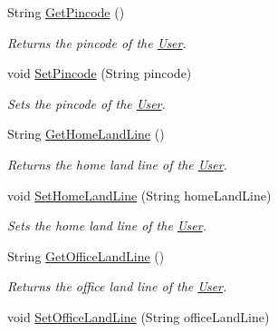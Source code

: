 \begin{DoxyCompactItemize}
String \hyperlink{classcom_1_1shephertz_1_1app42_1_1paas_1_1sdk_1_1csharp_1_1user_1_1_user_1_1_profile_a909844959aafaa5f1ec756ae49afcf9e}{Get\+Pincode} ()
\begin{DoxyCompactList}\small\item\em Returns the pincode of the \hyperlink{classcom_1_1shephertz_1_1app42_1_1paas_1_1sdk_1_1csharp_1_1user_1_1_user}{User}. \end{DoxyCompactList}\item 
void \hyperlink{classcom_1_1shephertz_1_1app42_1_1paas_1_1sdk_1_1csharp_1_1user_1_1_user_1_1_profile_a5f03513861df1e1c27e94a19ea9a2660}{Set\+Pincode} (String pincode)
\begin{DoxyCompactList}\small\item\em Sets the pincode of the \hyperlink{classcom_1_1shephertz_1_1app42_1_1paas_1_1sdk_1_1csharp_1_1user_1_1_user}{User}. \end{DoxyCompactList}\item 
String \hyperlink{classcom_1_1shephertz_1_1app42_1_1paas_1_1sdk_1_1csharp_1_1user_1_1_user_1_1_profile_a43032c7fdd4f4dd39961766d78ab46bc}{Get\+Home\+Land\+Line} ()
\begin{DoxyCompactList}\small\item\em Returns the home land line of the \hyperlink{classcom_1_1shephertz_1_1app42_1_1paas_1_1sdk_1_1csharp_1_1user_1_1_user}{User}. \end{DoxyCompactList}\item 
void \hyperlink{classcom_1_1shephertz_1_1app42_1_1paas_1_1sdk_1_1csharp_1_1user_1_1_user_1_1_profile_a8221d200514c3c7f654f2f1d8c0b564f}{Set\+Home\+Land\+Line} (String home\+Land\+Line)
\begin{DoxyCompactList}\small\item\em Sets the home land line of the \hyperlink{classcom_1_1shephertz_1_1app42_1_1paas_1_1sdk_1_1csharp_1_1user_1_1_user}{User}. \end{DoxyCompactList}\item 
String \hyperlink{classcom_1_1shephertz_1_1app42_1_1paas_1_1sdk_1_1csharp_1_1user_1_1_user_1_1_profile_aac7b15334c01fa85352c90e7665dd666}{Get\+Office\+Land\+Line} ()
\begin{DoxyCompactList}\small\item\em Returns the office land line of the \hyperlink{classcom_1_1shephertz_1_1app42_1_1paas_1_1sdk_1_1csharp_1_1user_1_1_user}{User}. \end{DoxyCompactList}\item 
void \hyperlink{classcom_1_1shephertz_1_1app42_1_1paas_1_1sdk_1_1csharp_1_1user_1_1_user_1_1_profile_a6233914a6855f63a4f56fad43f6d4ad4}{Set\+Office\+Land\+Line} (String office\+Land\+Line)

\end{DoxyCompactItemize}
